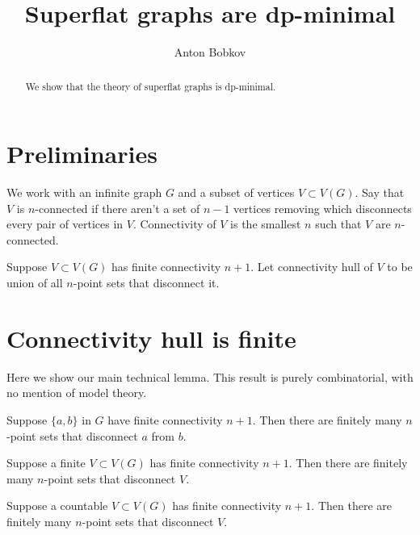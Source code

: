 \documentclass{amsart}
\begin{document}
\title{Superflat graphs are dp-minimal}
\author{Anton Bobkov}

\begin{abstract}
	We show that the theory of superflat graphs is dp-minimal.
\end{abstract}

\maketitle

\section{Preliminaries}

We work with an infinite graph $G$ and a subset of vertices $V \subset V(G)$. Say that $V$ is $n$-connected if there aren't a set of $n-1$ vertices removing which disconnects every pair of vertices in $V$. Connectivity of $V$ is the smallest $n$ such that $V$ are $n$-connected.

\begin{Definition}
	Suppose $V \subset V(G)$ has finite connectivity $n+1$. Let connectivity hull of $V$ to be union of all $n$-point sets that disconnect it.
\end{Definition}

\section{Connectivity hull is finite}

Here we show our main technical lemma. This result is purely combinatorial, with no mention of model theory.

\begin{Lemma}
	Suppose $\{a,b\}$ in $G$ have finite connectivity $n+1$. Then there are finitely many $n$-point sets that disconnect $a$ from $b$.
\end{Lemma}

\begin{Corollary}
	Suppose a finite $V \subset V(G)$ has finite connectivity $n+1$. Then there are finitely many $n$-point sets that disconnect $V$.
\end{Corollary}

\begin{Corollary}
	Suppose a countable $V \subset V(G)$ has finite connectivity $n+1$. Then there are finitely many $n$-point sets that disconnect $V$.
\end{Corollary}
\end{document}
